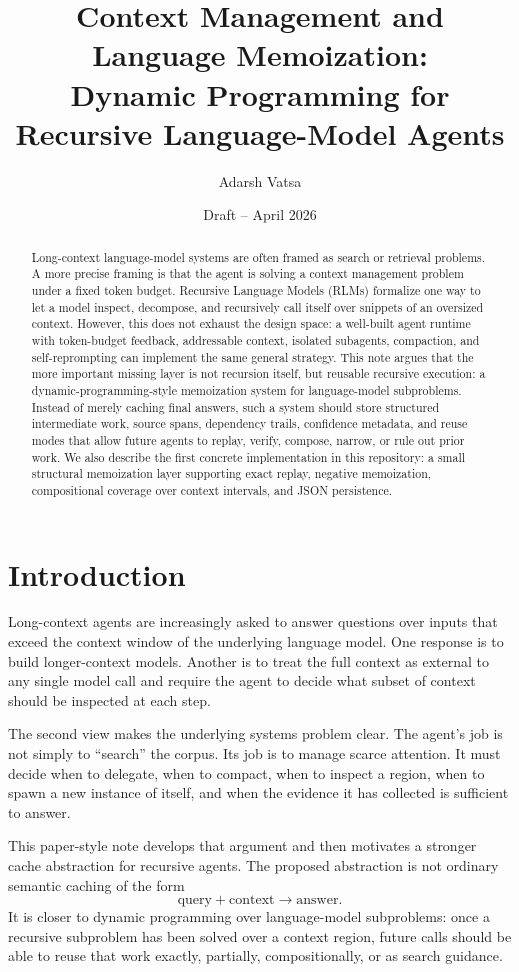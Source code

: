 \documentclass[11pt]{article}
\title{\textbf{Context Management and Language Memoization:\\
Dynamic Programming for Recursive Language-Model Agents}}
\author{Adarsh Vatsa}
\date{Draft -- April 2026}
\begin{document}
\maketitle

\begin{abstract}
Long-context language-model systems are often framed as search or retrieval
problems. A more precise framing is that the agent is solving a context
management problem under a fixed token budget. Recursive Language Models
(RLMs) formalize one way to let a model inspect, decompose, and recursively
call itself over snippets of an oversized context. However, this does not
exhaust the design space: a well-built agent runtime with token-budget
feedback, addressable context, isolated subagents, compaction, and
self-reprompting can implement the same general strategy. This note argues
that the more important missing layer is not recursion itself, but reusable
recursive execution: a dynamic-programming-style memoization system for
language-model subproblems. Instead of merely caching final answers, such a
system should store structured intermediate work, source spans, dependency
trails, confidence metadata, and reuse modes that allow future agents to
replay, verify, compose, narrow, or rule out prior work. We also describe the
first concrete implementation in this repository: a small structural
memoization layer supporting exact replay, negative memoization, compositional
coverage over context intervals, and JSON persistence.
\end{abstract}

\section{Introduction}

Long-context agents are increasingly asked to answer questions over inputs
that exceed the context window of the underlying language model. One response
is to build longer-context models. Another is to treat the full context as
external to any single model call and require the agent to decide what subset
of context should be inspected at each step.

The second view makes the underlying systems problem clear. The agent's job is
not simply to ``search'' the corpus. Its job is to manage scarce attention.
It must decide when to delegate, when to compact, when to inspect a region,
when to spawn a new instance of itself, and when the evidence it has collected
is sufficient to answer.

This paper-style note develops that argument and then motivates a stronger
cache abstraction for recursive agents. The proposed abstraction is not
ordinary semantic caching of the form
\[
    \text{query} + \text{context} \rightarrow \text{answer}.
\]
It is closer to dynamic programming over language-model subproblems: once a
recursive subproblem has been solved over a context region, future calls should
be able to reuse that work exactly, partially, compositionally, or as search
guidance.
\end{document}
